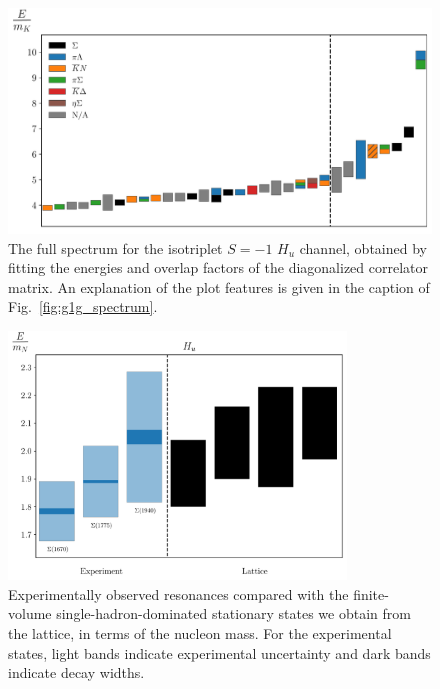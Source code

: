\begin{figure}[H]
    \centering
    \hspace*{-0.5in}\includegraphics[width=\textwidth]{figures/sigmas/hu/staircase_mk.pdf}
    \caption{The full spectrum for the isotriplet $S=-1$ $H_u$ channel, obtained by fitting the energies and overlap factors of the diagonalized correlator matrix. An explanation of the plot features is given in the caption of Fig.~\ref{fig:g1g_spectrum}.}\label{fig:hu_spectrum}
\end{figure}

\begin{figure}[H]
    \centering
    \includegraphics[width=0.8\textwidth]{figures/sigmas/hu/expvslat.pdf}
    \caption{Experimentally observed resonances compared with the finite-volume single-hadron-dominated stationary states we obtain from the lattice, in terms of the nucleon mass. For the experimental states, light bands indicate experimental uncertainty and dark bands indicate decay widths.}\label{fig:hu_exp}
\end{figure}

